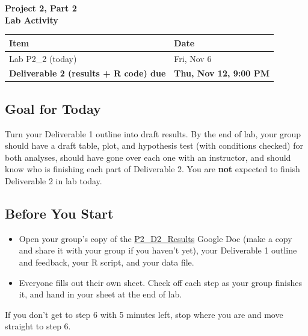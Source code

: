 \documentclass[12pt]{article}
\begin{document}
\begin{center}
\textbf{\Large Project 2, Part 2 \\ Lab Activity}
\end{center}

\nameBUID
\begin{center}
\begin{tabular}{ll}
\toprule
\textbf{Item} & \textbf{Date} \\
\midrule
Lab P2\_2 (today) & Fri, Nov 6 \\
\textbf{Deliverable 2 (results + R code) due} & \textbf{Thu, Nov 12, 9:00 PM} \\
\bottomrule
\end{tabular}
\end{center}

\subsection*{Goal for Today}
Turn your Deliverable 1 outline into draft results. By the end of lab, your group should have a draft table, plot, and hypothesis test (with conditions checked) for both analyses, should have gone over each one with an instructor, and should know who is finishing each part of Deliverable 2. You are \textbf{not} expected to finish Deliverable 2 in lab today.

\subsection*{Before You Start}
\begin{itemize}[nosep]
    \item Open your group's copy of the \href{https://docs.google.com/document/d/1H2uHoyaKZ9WlIEoHcfATuVc-I91VaTd27rTGJ7s2Lc0/edit?usp=sharing}{P2\_D2\_Results} Google Doc (make a copy and share it with your group if you haven't yet), your Deliverable 1 outline and feedback, your R script, and your data file.
    \item Everyone fills out their own sheet. Check off each step as your group finishes it, and hand in your sheet at the end of lab.
\end{itemize}

\vspace{6pt}
\noindent If you don't get to step 6 with 5 minutes left, stop where you are and move straight to step 6.
\end{document}
